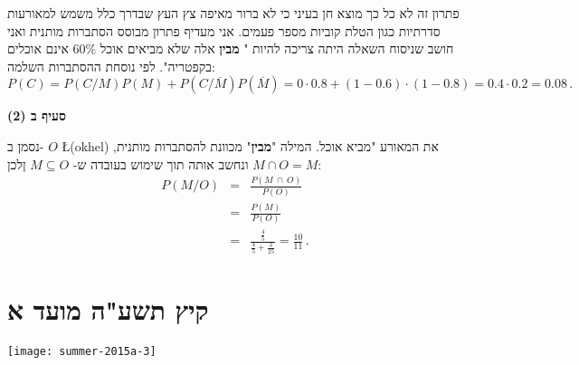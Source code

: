 \begin{figure}
\begin{center}
\end{center}
\end{figure}
פתרון זה לא כל כך מוצא חן בעיני כי לא ברור מאיפה צץ העץ שבדרך כלל משמש למאורעות סדרתיות כגון הטלת קוביות מספר פעמים. אני מעדיף פתרון מבוסס הסתברות מותנית ואני חושב שניסוח השאלה היתה צריכה להיות "%
\textbf{מבין}
אלה שלא מביאים אוכל
$60\%$
אינם אוכלים בקפטריה". לפי נוסחת ההסתברות השלמה:
\[
P(C) = P(C/M)P(M) + P(C/\overline{M})P(\overline{M})=
0\cdot 0.8 + (1-0.6)\cdot (1-0.8)=0.4\cdot 0.2=0.08\,.
\]


\textbf{סעיף ב (2)}

נסמן ב-%
$O$ \L{(okhel)}
את המאורע "מביא אוכל. המילה
"\textbf{מבין}"
מכוונת להסתברות מותנית, ונחשב אותה תוך שימוש בעובדה ש-%
$M\subseteq O$
ןלכן
$M\cap O = M$:
\begin{eqnarray*}
P(M/O) &=& \frac{P(M \:\cap\: O)}{P(O)}\\
&=& \frac{P(M)}{P(O)}\\
&=&\frac{\frac{4}{5}}{\frac{4}{5}+\frac{2}{25}}=\frac{10}{11}\,.
\end{eqnarray*}


\section{קיץ תשע"ה מועד א}

\begin{center}
\texttt{[image: summer-2015a-3]}
\end{center}

